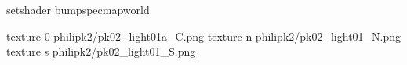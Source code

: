 setshader bumpspecmapworld

texture 0 philipk2/pk02_light01a_C.png
texture n philipk2/pk02_light01_N.png
texture s philipk2/pk02_light01_S.png

